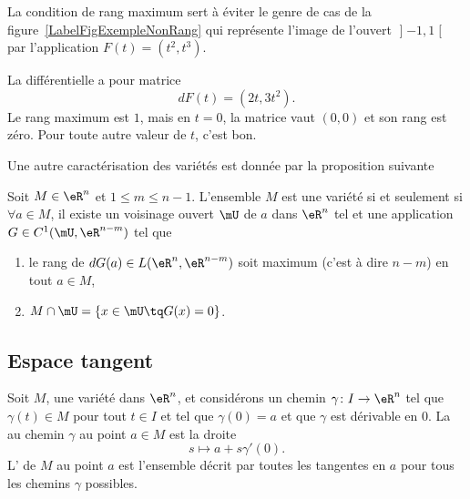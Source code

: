 La condition de rang maximum sert à éviter le genre de cas de la figure~\ref{LabelFigExempleNonRang} qui représente l'image de l'ouvert $\mathopen] -1 , 1 \mathclose[$ par l'application $F(t)=(t^2,t^3)$.
\newcommand{\CaptionFigExempleNonRang}{Quelque chose qui n'est pas de rang maximum et qui n'est pas une variété.}

%
La différentielle a pour matrice
\begin{equation}
    dF(t)=(2t,3t^2).
\end{equation}
Le rang maximum est $1$, mais en $t=0$, la matrice vaut $(0,0)$ et son rang est zéro. Pour toute autre valeur de $t$, c'est bon.

Une autre caractérisation des variétés est donnée par la proposition suivante %
\begin{proposition}     \label{PropCarVarZerFonc}
    Soit $M\in \eR^n$ et $1\leq m\leq n-1$. L'ensemble $M$ est une variété si et seulement si $\forall a\in M$, il existe un voisinage ouvert $\mU$ de $a$ dans $\eR^n$ tel et une application $G\in C^1(\mU,\eR^{n-m})$ tel que
    \begin{enumerate}

        \item
            le rang de $dG(a)\in L(\eR^n,\eR^{n-m})$ soit maximum (c'est à dire $n-m$) en tout $a\in M$,
        \item
            $M\cap\mU=\{ x\in\mU\tq G(x)=0 \}$.

    \end{enumerate}
\end{proposition}

\subsection{Espace tangent}

Soit $M$, une variété dans $\eR^n$, et considérons un chemin $\gamma\colon I\to \eR^n$ tel que $\gamma(t)\in M$ pour tout $t\in I$ et tel que $\gamma(0)=a$ et que $\gamma$ est dérivable en $0$. La  au chemin $\gamma$ au point $a\in M$ est la droite
\begin{equation}
    s\mapsto a+s\gamma'(0).
\end{equation}
L' de $M$ au point $a$ est l'ensemble décrit par toutes les tangentes en $a$ pour tous les chemins $\gamma$ possibles.

